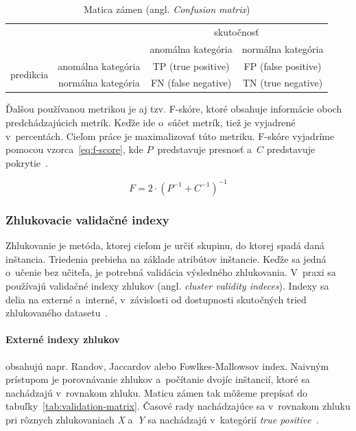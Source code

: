 \documentclass[a4paper,twoside,slovak,12pt,appendix]{article}
\begin{document}
\begin{table}[htbp]
	\centering
	\caption{Matica zámen (angl. \textit{Confusion matrix})}
	\label{tab:confusion-matrix}
	\begin{tabular}{|c|c|c|c|}
		\hline
		\multicolumn{2}{|c|}{\multirow{2}{*}{}} 									 & \multicolumn{2}{c|}{skutočnosť} 							 \\ \cline{3-4}
		\multicolumn{2}{|c|}{}       									      			 &  anomálna kategória   &  normálna kategória   \\ \hline
		\multirow{2}{*}[1.2pt]{predikcia}   &  anomálna kategória  &  TP (true positive)   &  FP (false positive)  \\ \cline{2-4}
																				&  normálna kategória  &  FN (false negative)  &  TN (true negative)   \\ \hline
	\end{tabular}
\end{table}

\noindent
Ďalšou používanou metrikou je aj tzv. F-skóre, ktoré obsahuje informácie oboch
predchádzajúcich metrík. Keďže ide o~súčet metrík, tiež je vyjadrené
v~percentách. Cieľom práce je maximalizovať túto metriku. F-skóre vyjadríme
pomocou vzorca~\ref{eq:f-score}, kde $P$~predstavuje presnosť a~$C$ predstavuje
pokrytie~\cite{Trevizan2015}.

\begin{equation}
	\label{eq:f-score}
  F = 2 \cdot \left( P^{-1} + C^{-1} \right)^{-1}
\end{equation}

\subsubsection{Zhlukovacie validačné indexy}
\label{c:cluster-validity-indeces}
Zhlukovanie je metóda, ktorej cieľom je určiť skupinu, do ktorej spadá daná
inštancia. Triedenia prebieha na základe atribútov inštancie. Keďže sa jedná
o~učenie bez učiteľa, je potrebná validácia výsledného zhlukovania. V~praxi sa
používajú validačné indexy zhlukov (angl. \textit{cluster validity indeces}).
Indexy sa delia na externé a~interné, v~závislosti od dostupnosti skutočných
tried zhlukovaného datasetu~\cite{Arbelaitz2013}.

\paragraph{Externé indexy zhlukov} obsahujú napr. Randov, Jaccardov alebo
Fowlkes-Mallowsov index. Naivným prístupom je porovnávanie zhlukov a~počítanie
dvojíc inštancií, ktoré sa nachádzajú v~rovnakom zhluku. Maticu zámen tak
môžeme prepísať do tabuľky~\ref{tab:validation-matrix}. Časové rady nachádzajúce
sa v~rovnakom zhluku pri rôznych zhlukovaniach \textit{X} a~\textit{Y} sa
nachádzajú v~kategórií \textit{true positive}~\cite{Bilgic2018}.
\end{document}

